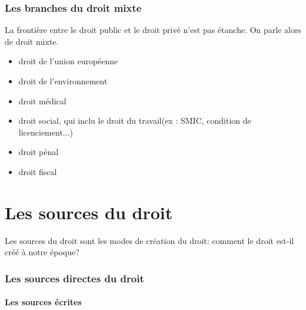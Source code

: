 \documentclass[a4paper]{article}
\begin{document}
		\section{Les branches du droit mixte}
			La frontière entre le droit public et le droit privé n'est pas étanche. On parle alors de droit mixte. 
			\begin{itemize}
				\item droit de l'union européenne 
				\item droit de l'environnement
				\item droit médical
				\item droit social, qui inclu le droit du travail(ex : SMIC, condition de licenciement...)
				\item droit pénal
				\item droit fiscal
			\end{itemize}
	\newpage\part{Les sources du droit}
		Les sources du droit sont les modes de création du droit: comment le droit est-il créé à notre époque?
		\section{Les sources directes du droit}
			\subsection{Les sources écrites}
\end{document}
